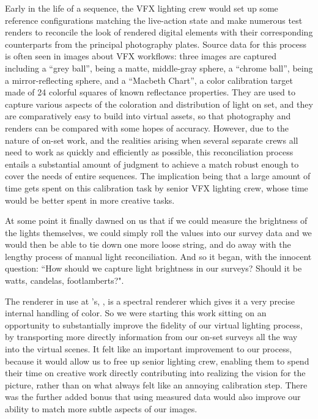 Early in the life of a sequence, the \gls{VFX} lighting crew would set up some reference configurations
matching the live-action state and make numerous test renders to reconcile the look of rendered
digital elements with their corresponding counterparts from the principal photography plates. 
Source data for this process is often seen in images about \gls{VFX} workflows: three images are captured including
a ``grey ball'', being a matte, middle-gray sphere, a ``chrome ball'', being a mirror-reflecting
sphere, and a ``Macbeth Chart'', a color calibration target made of 24 colorful squares of known 
reflectance properties.
They are used to capture various aspects of the coloration and distribution of light on set,
and they are comparatively easy to build into \gls{virtual} assets, so that photography and renders 
can be compared with some hopes of accuracy.
However, due to the nature of on-set work, and the realities arising when several separate crews 
all need to work as quickly and efficiently as possible, this reconciliation process entails a 
substantial amount of judgment to achieve a match robust enough to cover the needs of entire sequences. 
The implication being that a large amount of time gets spent on this calibration task by 
senior \gls{VFX} lighting crew, whose time would be better spent in more creative tasks.

At some point it finally dawned on us that if we could measure the brightness
of the lights themselves, we could simply roll the values into our survey data 
and we would then be able to tie down one more loose string, 
and do away with the lengthy process of manual light reconciliation. 
And so it began, with the innocent question: ``How should we capture light 
brightness in our surveys? Should it be watts, candelas, footlamberts?".


The renderer in use at 's, , is a spectral renderer
which gives it a very precise internal handling of color. 
So we were starting this work sitting on an opportunity to substantially improve the fidelity of 
our \gls{virtual} lighting process, by transporting more directly information from our on-set 
surveys all the way into the \gls{virtual} scenes.
It felt like an important improvement to our process, because it would allow us to free up 
senior lighting crew, enabling them to spend their time on creative work directly contributing into
realizing the vision for the picture, rather than on what always felt like an annoying calibration step.
There was the further added bonus that using measured data would also improve our ability to match 
more subtle aspects of our images.

